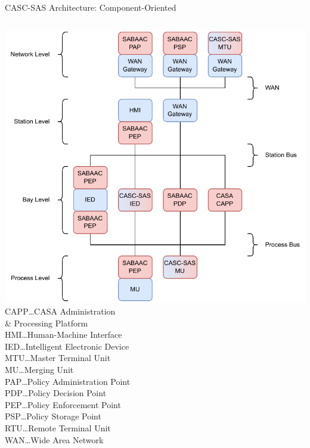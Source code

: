 \documentclass[en]{sdqbeamer}
\begin{document}
\begin{frame}{CASC-SAS Architecture: Component-Oriented}
    \begin{columns}
        \centering
        \includegraphics[height=0.75\textheight]{./figures/casc_architecture_color.drawio.pdf}
        \footnotesize
        CAPP\dots CASA Administration\\\qquad\qquad\& Processing Platform\\HMI\dots Human-Machine Interface\\IED\dots Intelligent Electronic Device\\MTU\dots Master Terminal Unit\\MU\dots Merging Unit\\PAP\dots Policy Administration Point\\PDP\dots Policy Decision Point\\PEP\dots Policy Enforcement Point\\PSP\dots Policy Storage Point\\RTU\dots Remote Terminal Unit\\WAN\dots Wide Area Network
    \end{columns}
\end{frame}
\end{document}
